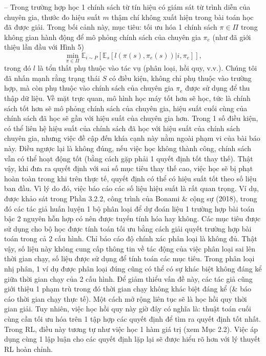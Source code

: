 \documentclass{article}
\begin{document}
\begin{itemize}
\begin{itemize}
        -- Trong trường hợp học 1 chính sách từ tín hiệu có giám sát từ trình diễn của chuyên gia, thước đo hiệu suất $m$ thậm chí không xuất hiện trong bài toán học đã được giải. Trong bối cảnh này, mục tiêu: tối ưu hóa 1 chính sách $\pi\in\Pi$ trong không gian hành động để mô phỏng chính sách của chuyên gia $\pi_e$ (như đã giới thiệu lần đầu với Hình 5)
        \begin{equation*}
            \min_{\pi\in\Pi} \mathbb{E}_{i\sim P}[\mathbb{E}_s[l(\pi(s),\pi_e(s))|i,\pi_e]],
        \end{equation*}
        trong đó $l$ là tổn thất phụ thuộc vào tác vụ (phân loại, hồi quy, v.v.). Chúng tôi đã nhấn mạnh rằng trạng thái $S$ có điều kiện, không chỉ phụ thuộc vào trường hợp, mà còn phụ thuộc vào chính sách của chuyên gia $\pi_e$ được sử dụng để thu thập dữ liệu. Về mặt trực quan, mô hình học máy tốt hơn sẽ học, tức là chính sách tốt hơn sẽ mô phỏng chính sách của chuyên gia, hiệu suất cuối cùng của chính sách đã học sẽ gần với hiệu suất của chuyên gia hơn. Trong 1 số điều kiện, có thể liên hệ hiệu suất của chính sách đã học với hiệu suất của chính sách chuyên gia, nhưng việc đề cập đến khía cạnh này nằm ngoài phạm vi của bài báo này. Điều ngược lại là không đúng, nếu việc học không thành công, chính sách vẫn có thể hoạt động tốt (bằng cách gặp phải 1 quyết định tốt thay thế). Thật vậy, khi đưa ra quyết định với sai số mục tiêu thay thế cao, việc học sẽ bị phạt hoàn toàn trong khi trên thực tế, quyết định có thể có hiệu suất tốt theo số liệu ban đầu. Vì lý do đó, việc báo cáo các số liệu hiệu suất là rất quan trọng. Ví dụ, được khảo sát trong Phần 3.2.2, công trình của Bonami \& cộng sự (2018), trong đó các tác giả huấn luyện 1 bộ phân loại để dự đoán liệu 1 trường hợp bài toán bậc 2 nguyên hỗn hợp có nên được tuyến tính hóa hay không. Các mục tiêu được sử dụng cho bộ học được tính toán tối ưu bằng cách giải quyết trường hợp bài toán trong cả 2 cấu hình. Chỉ báo cáo độ chính xác phân loại là không đủ. Thật vậy, số liệu này không cung cấp thông tin về tác động của việc phân loại sai lên thời gian chạy, số liệu được sử dụng để tính toán các mục tiêu. Trong phân loại nhị phân, 1 ví dụ được phân loại đúng cũng có thể có sự khác biệt không đáng kể giữa thời gian chạy của 2 cấu hình. Để giảm thiểu vấn đề này, các tác giả cũng giới thiệu 1 phạm trù trong đó thời gian chạy không khác biệt đáng kể (\& báo cáo thời gian chạy thực tế). Một cách mở rộng liên tục sẽ là học hồi quy thời gian giải. Tuy nhiên, việc học hồi quy này giờ đây có nghĩa là: thuật toán cuối cùng cần tối ưu hóa trên 1 tập hợp các quyết định để tìm ra quyết định tốt nhất. Trong RL, điều này tương tự như việc học 1 hàm giá trị (xem Mục 2.2). Việc áp dụng cùng 1 lập luận cho các quyết định lặp lại sẽ được hiểu rõ hơn với lý thuyết RL hoàn chỉnh.

\end{itemize}
\end{itemize}
\end{document}
